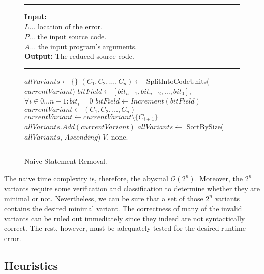 \begin{figure}[h]
	\hrule height.8pt depth0pt \kern2pt
	\textbf{Input:} \\
	\hspace*{\algorithmicindent} $L \ldots$ location of the error. \\
	\hspace*{\algorithmicindent} $P \ldots$ the input source code. \\
	\hspace*{\algorithmicindent} $A \ldots$ the input program's arguments. \\
	\textbf{Output:} The reduced source code. 
	\hrule height.8pt depth0pt \kern2pt
	\begin{algorithmic}[1]
		\State $allVariants \leftarrow \{\}$
		\State $(C_1, C_2, \ldots, C_n) \leftarrow$ SplitIntoCodeUnits($currentVariant$)
		\State $bitField \leftarrow [{bit}_{n-1}, {bit}_{n-2}, \ldots, {bit}_0]$,  
			$\forall i \in 0 \ldots n-1 : bit_i = 0$
			\State $bitField \leftarrow Increment(bitField)$ 
			\State $currentVariant \leftarrow (C_1, C_2, \ldots, C_n)$
					\State $currentVariant \leftarrow currentVariant \setminus \{C_{i+1}\}$
				\EndIf
			\EndFor
			\State $allVariants.Add(currentVariant)$
		\EndWhile
		\State $allVariants \leftarrow$ SortBySize($allVariants$, $Ascending$)
				\Return $V$.
			\EndIf
		\EndFor
		\State \Return none.
	\end{algorithmic} 
	\hrule height.8pt depth0pt \kern2pt
	\caption{Naive Statement Removal.} 
	\label{alg:naive}
\end{figure}

The naive time complexity is, therefore, the abysmal $\mathcal{O}(2^n)$.
Moreover, the $2^n$ variants require some verification and classification 
to determine whether they are minimal or not.
Nevertheless, we can be sure that a set of those $2^n$ variants contains 
the desired minimal variant.
The correctness of many of the invalid variants can be ruled out immediately
since they indeed are not syntactically correct.
The rest, however, must be adequately tested for the desired runtime error.

\subsection{Heuristics}\label{chap:heuristics}

